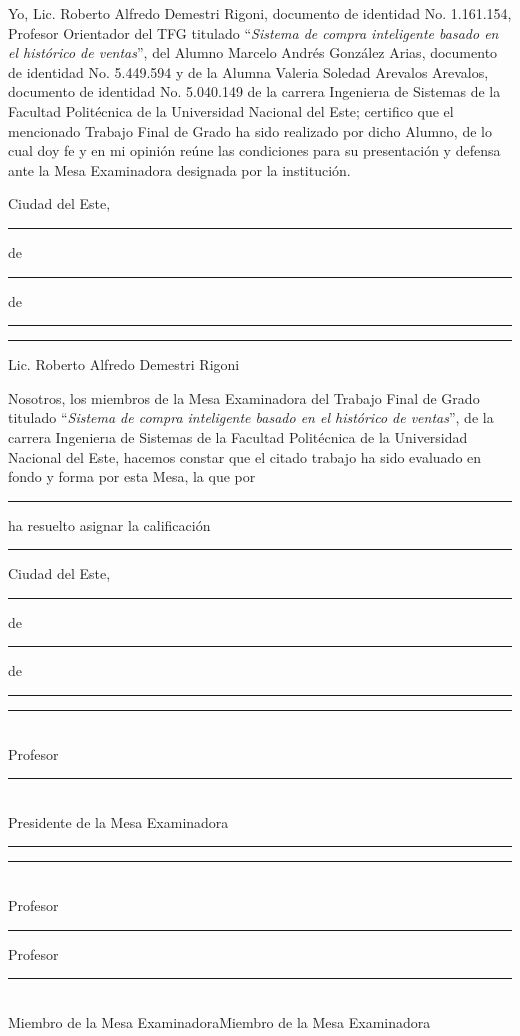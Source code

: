 \thispagestyle{empty}

Yo, Lic. Roberto Alfredo Demestri Rigoni, documento de identidad No. 1.161.154, Profesor Orientador del TFG titulado ``\textit{Sistema de compra inteligente basado en el histórico de ventas}'', del Alumno Marcelo Andrés González Arias, documento de identidad No. 5.449.594 y de la Alumna Valeria Soledad Arevalos Arevalos, documento de identidad No. 5.040.149 de la carrera Ingenierıa de Sistemas de la Facultad Politécnica de la Universidad Nacional del Este; certifico que el mencionado Trabajo Final de Grado ha sido realizado por dicho Alumno, de lo cual doy fe y en mi opinión reúne las condiciones para su presentación y defensa ante la Mesa Examinadora designada por la institución.

\begin{flushright}Ciudad del Este, \rule{1cm}{0.4pt} de \rule{2cm}{0.4pt} de \rule{1cm}{0.4pt} \end{flushright}
\vspace{0.7cm}
	
\hspace{7cm}\rule{6cm}{0.4pt}
\begin{flushright}
Lic. Roberto Alfredo Demestri Rigoni
\end{flushright}
		
\vspace{1.6cm}
Nosotros, los miembros de la Mesa Examinadora del Trabajo Final de Grado titulado ``\textit{Sistema de compra inteligente basado en el histórico de ventas}'', de la carrera Ingenierıa de Sistemas de la Facultad Politécnica de la Universidad Nacional del Este, hacemos constar que el citado trabajo ha sido evaluado en fondo y forma por esta Mesa, la que por \rule{4cm}{0.4pt} ha resuelto asignar la calificación \rule{2cm}{0.4pt}

\begin{flushright}Ciudad del Este, \rule{1cm}{0.4pt} de \rule{2cm}{0.4pt} de \rule{1cm}{0.4pt} \end{flushright}

\vspace{.5cm}
\hspace{2.2cm}\rule{7cm}{0.4pt}\\
\hspace*{3cm} Profesor \rule{4.5cm}{0.4pt}\\
\hspace*{2.8cm} Presidente de la Mesa Examinadora
\vspace{.7cm}

\hspace*{-0.4cm}\rule{6cm}{0.4pt}\hspace{1.15cm}\rule{6cm}{0.4pt}\\
\vspace{.3cm}
Profesor \rule{4.5cm}{0.4pt}		\hspace{.9cm}Profesor \rule{4.5cm}{0.4pt}\\
Miembro de la Mesa Examinadora\hspace{1cm}Miembro de la Mesa Examinadora
